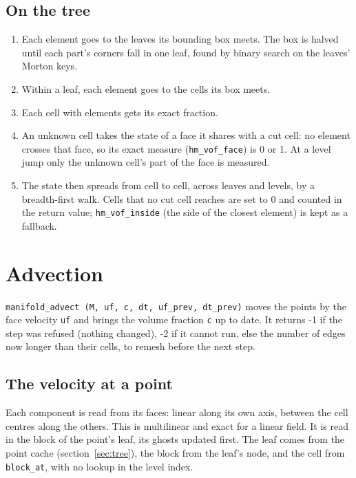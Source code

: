 \documentclass[10pt,a4paper]{article}
\theoremstyle{definition}
\newcommand{\fn}[1]{\texttt{#1}}
\begin{document}
\subsection{On the tree}

\begin{enumerate}
  \item Each element goes to the leaves its bounding box meets. The box is
    halved until each part's corners fall in one leaf, found by binary search
    on the leaves' Morton keys.
  \item Within a leaf, each element goes to the cells its box meets.
  \item Each cell with elements gets its exact fraction.
  \item An unknown cell takes the state of a face it shares with a cut cell:
    no element crosses that face, so its exact measure (\fn{hm\_vof\_face})
    is 0 or 1. At a level jump only the unknown cell's part of the face is
    measured.
  \item The state then spreads from cell to cell, across leaves and levels,
    by a breadth-first walk. Cells that no cut cell reaches are set to 0 and
    counted in the return value; \fn{hm\_vof\_inside} (the side of the
    closest element) is kept as a fallback.
\end{enumerate}

\section{Advection}
\label{sec:advect}

\fn{manifold\_advect (M, uf, c, dt, uf\_prev, dt\_prev)} moves the points by
the face velocity \fn{uf} and brings the volume fraction \fn{c} up to date.
It returns -1 if the step was refused (nothing changed), -2 if it cannot
run, else the number of edges now longer than their cells, to remesh before
the next step.

\subsection{The velocity at a point}

Each component is read from its faces: linear along its own axis, between
the cell centres along the others. This is multilinear and exact for a
linear field. It is read in the block of the point's leaf, its ghosts
updated first. The leaf comes from the point cache (section~\ref{sec:tree}),
the block from the leaf's node, and the cell from \fn{block\_at}, with no
lookup in the level index.
\end{document}
